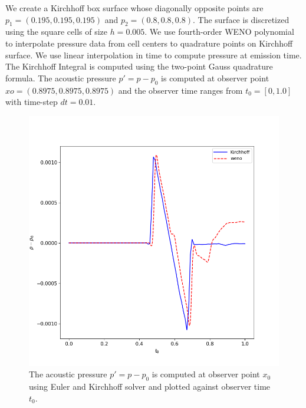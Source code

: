\documentclass[a4paper]{article}
\begin{document}
We create a Kirchhoff box surface whose diagonally opposite points are $p_{1} = (0.195, 0.195, 0.195)$
and $p_{2} = (0.8, 0.8, 0.8)$. The surface is discretized using the square cells of size $h = 0.005$. We use fourth-order WENO polynomial to interpolate pressure data from cell centers to quadrature points on Kirchhoff surface. We use linear interpolation in time to compute pressure at emission time. The Kirchhoff Integral is computed using the two-point Gauss quadrature formula. The acoustic pressure $p' = p - p_{0}$ is computed at observer point $xo = (0.8975,0.8975,0.8975)$ and the observer time ranges from $t_{0} = [0,1.0]$ with time-step $dt = 0.01$.
\begin{figure}\label{result}
	\centering
	\includegraphics[scale=.7]{images/Pressure.png}
	\caption{The acoustic pressure $p' = p - p_{0}$ is computed at observer point $x_{0}$ using Euler and Kirchhoff solver and plotted against observer time $t_{0}$.}
\end{figure}
\printbibliography
\end{document}
